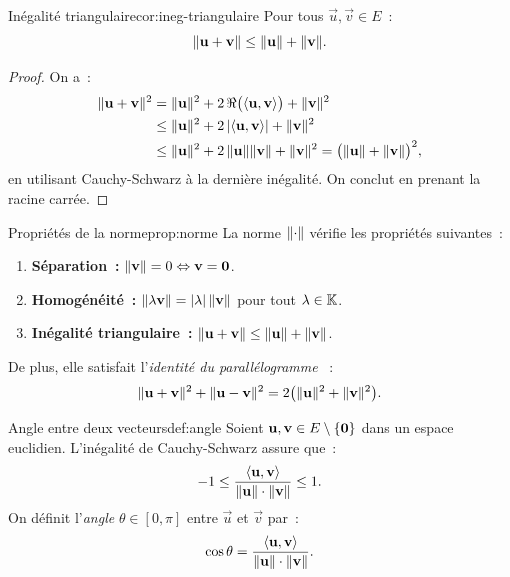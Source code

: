 \begin{corollary}{Inégalité triangulaire}{cor:ineg-triangulaire}
  Pour tous $\vec{u},\vec{v}\in E$~:
  \[
    \lVert\mathbf{u}+\mathbf{v}\rVert\leq\lVert\mathbf{u}\rVert+\lVert\mathbf{v}\rVert.
  \]
\end{corollary}

\begin{proof}
  On a~:
  \begin{align*}
    \lVert\mathbf{u}+\mathbf{v}\rVert^2
    &=\lVert\mathbf{u}\rVert^2+2\,\Re\bigl(\langle\mathbf{u},\mathbf{v}\rangle\bigr)
      +\lVert\mathbf{v}\rVert^2 \\
    &\leq\lVert\mathbf{u}\rVert^2+2\,\lvert\langle\mathbf{u},\mathbf{v}\rangle\rvert
      +\lVert\mathbf{v}\rVert^2 \\
    &\leq\lVert\mathbf{u}\rVert^2+2\,\lVert\mathbf{u}\rVert\lVert\mathbf{v}\rVert
      +\lVert\mathbf{v}\rVert^2
    =\bigl(\lVert\mathbf{u}\rVert+\lVert\mathbf{v}\rVert\bigr)^2,
  \end{align*}
  en utilisant Cauchy-Schwarz à la dernière inégalité. On conclut en
  prenant la racine carrée.
\end{proof}

\begin{proposition}{Propriétés de la norme}{prop:norme}
  La norme $\lVert\cdot\rVert$ vérifie les propriétés suivantes~:
  \begin{enumerate}[label=(\roman*)]
    \item \textbf{Séparation~:} $\lVert\mathbf{v}\rVert=0\Leftrightarrow
      \mathbf{v}=\mathbf{0}$.
    \item \textbf{Homogénéité~:}
      $\lVert\lambda\mathbf{v}\rVert=\lvert\lambda\rvert\,\lVert\mathbf{v}\rVert$ pour tout
      $\lambda\in{\mathbb{K}}$.
    \item \textbf{Inégalité triangulaire~:}
      $\lVert\mathbf{u}+\mathbf{v}\rVert\leq\lVert\mathbf{u}\rVert+\lVert\mathbf{v}\rVert$.
  \end{enumerate}
  De plus, elle satisfait l'\emph{identité du parallélogramme}%
  ~:
  \[
    \lVert\mathbf{u}+\mathbf{v}\rVert^2+\lVert\mathbf{u}-\mathbf{v}\rVert^2
    =2\bigl(\lVert\mathbf{u}\rVert^2+\lVert\mathbf{v}\rVert^2\bigr).
  \]
\end{proposition}

\begin{definition}{Angle entre deux vecteurs}{def:angle}
  Soient $\mathbf{u},\mathbf{v}\in E\setminus\left\{\mathbf{0}\right\}$ dans un espace
  euclidien. L'inégalité de Cauchy-Schwarz assure que~:
  \[
    -1\leq\frac{\inner{\vec{u},\vec{v}}}%
    {\norm{\vec{u}}\cdot\norm{\vec{v}}}\leq 1.
  \]
  On définit l'\emph{angle} $\theta\in[0,\pi]$ entre $\vec{u}$ et
  $\vec{v}$ par~:
  \[
    \cos\theta=\frac{\inner{\vec{u},\vec{v}}}%
    {\norm{\vec{u}}\cdot\norm{\vec{v}}}.
  \]
\end{definition}

